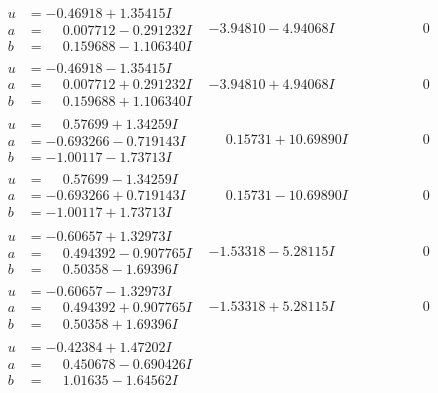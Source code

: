\documentclass[1p]{elsarticle_modified}
\theoremstyle{definition}
\begin{document}
$$\begin{array}{c|c|c}
\begin{aligned}
u &= -0.46918 + 1.35415 I \\
a &= \phantom{-}0.007712 - 0.291232 I \\
b &= \phantom{-}0.159688 - 1.106340 I\end{aligned}
 & -3.94810 - 4.94068 I & \phantom{-0.000000 } 0 \\ \hline\begin{aligned}
u &= -0.46918 - 1.35415 I \\
a &= \phantom{-}0.007712 + 0.291232 I \\
b &= \phantom{-}0.159688 + 1.106340 I\end{aligned}
 & -3.94810 + 4.94068 I & \phantom{-0.000000 } 0 \\ \hline\begin{aligned}
u &= \phantom{-}0.57699 + 1.34259 I \\
a &= -0.693266 - 0.719143 I \\
b &= -1.00117 - 1.73713 I\end{aligned}
 & \phantom{-}0.15731 + 10.69890 I & \phantom{-0.000000 } 0 \\ \hline\begin{aligned}
u &= \phantom{-}0.57699 - 1.34259 I \\
a &= -0.693266 + 0.719143 I \\
b &= -1.00117 + 1.73713 I\end{aligned}
 & \phantom{-}0.15731 - 10.69890 I & \phantom{-0.000000 } 0 \\ \hline\begin{aligned}
u &= -0.60657 + 1.32973 I \\
a &= \phantom{-}0.494392 - 0.907765 I \\
b &= \phantom{-}0.50358 - 1.69396 I\end{aligned}
 & -1.53318 - 5.28115 I & \phantom{-0.000000 } 0 \\ \hline\begin{aligned}
u &= -0.60657 - 1.32973 I \\
a &= \phantom{-}0.494392 + 0.907765 I \\
b &= \phantom{-}0.50358 + 1.69396 I\end{aligned}
 & -1.53318 + 5.28115 I & \phantom{-0.000000 } 0 \\ \hline\begin{aligned}
u &= -0.42384 + 1.47202 I \\
a &= \phantom{-}0.450678 - 0.690426 I \\
b &= \phantom{-}1.01635 - 1.64562 I\end{aligned}

\end{array}$$
\end{document}
